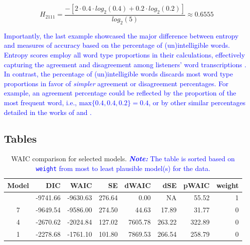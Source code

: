 \documentclass[
  authoryear,
  preprint,
  1p]{elsarticle}
\begin{document}
\[
H_{2111} = \frac{ -\left[ 2 \cdot 0.4 \cdot log_{2}(0.4) + 0.2 \cdot log_{2}(0.2) \right] }{ log_{2}(5)} \approx 0.6555
\]

\textcolor{blue}{Importantly, the last example showcased the major difference between
entropy and measures of accuracy based on the percentage of
(un)intelligible words. Entropy scores employ all word type proportions
in their calculations, effectively capturing the agreement and
disagreement among listeners' word transcriptions
\citep{Boonen_et_al_2023}. In contrast, the percentage of
(un)intelligible words discards most word type proportions in favor of
\emph{simpler} agreement or disagreement percentages. For example, an
agreement percentage could be reflected by the proportion of the most
frequent word, i.e., \(\text{max}\{ 0.4, 0.4, 0.2 \}=0.4\), or by other
similar percentages detailed in the works of \citet{Flipsen_2006} and
\citet{Lagerberg_et_al_2014}.}

\newpage{}

\subsection{Tables}\label{sec-appB}

\begin{longtable}[]{@{}crrrrrrr@{}}

\caption{\label{tbl-rq1-waic}WAIC comparison for selected models.
\textcolor{blue}{\textbf{\emph{Note:}} The table is sorted based on \texttt{weight} from
most to least plausible model(s) for the data.}}

\tabularnewline

\toprule\noalign{}
Model & DIC & WAIC & SE & dWAIC & dSE & pWAIC & weight \\
\midrule\noalign{}
\endhead
\bottomrule\noalign{}
\endlastfoot
10 & -9741.66 & -9630.63 & 276.64 & 0.00 & NA & 55.52 & 1 \\
7 & -9649.54 & -9586.00 & 274.50 & 44.63 & 17.89 & 31.77 & 0 \\
4 & -2670.62 & -2024.84 & 127.02 & 7605.78 & 263.22 & 322.89 & 0 \\
1 & -2278.68 & -1761.10 & 101.80 & 7869.53 & 266.54 & 258.79 & 0 \\

\end{longtable}
\end{document}
